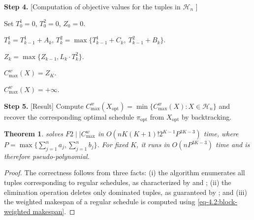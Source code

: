 \documentclass[12pt]{article}
\newtheorem{theorem}{Theorem}[section]
\begin{document}
\begin{sloppypar}
\begin{algorithm}[H]
            \textbf{Step 4.} [Computation of objective values for the tuples in $\mathcal{H}_n$ ] 
            
            {
                {
                    Set $T_0^1= 0$, $T_0^2=0$, $Z_0=0$. \;
                    
                    {
                        $T_k^1= T_{k-1}^1+A_k$, $T_k^2 = \max\{T_{k-1}^1+C_k,\ T_{k-1}^2+B_k\}$. \;
                        
                        $Z_k = \max \{Z_{k-1}, L_k \cdot T_k^2\}$. \;
                    }
                    
                    $C_{\max}^w(X)=Z_K$. \;                   
                }{
                    $C_{\max}^w(X)=+\infty$. \;
                }
            }
            \textbf{Step 5.} [Result] Compute $C_{\max}^w(X_{\mathrm{opt}})=\min \{C_{\max}^w(X): X \in \mathcal{H}_n\}$ and recover the corresponding optimal schedule $\pi_{\mathrm{opt}}$ from $X_{\mathrm{opt}}$ by backtracking. \;
            
        \end{algorithm}
        
        
        \begin{theorem}\label{thm:complexity}
             solves $F2 \mid \mid C_{\max}^w$ in $O(n K (K+1)! 2^{K-1} P^{3K-3})$ time, where
            $P = \max \{\sum_{j=1}^{n}a_j, \sum_{j=1}^{n}b_j\}$. For fixed $K$, it runs in $O(nP^{3K-3})$ time and is therefore pseudo-polynomial.
        \end{theorem}
        
        \begin{proof}
            The correctness follows from three facts: (i) the algorithm enumerates all tuples corresponding to regular schedules, as  characterized by  and ; (ii) the elimination operation deletes only dominated tuples, as guaranteed by ; and (iii) the weighted makespan of a regular schedule is computed using \cref{eq-4.2:block-weighted makespan}.
            

\end{proof}
\end{sloppypar}
\end{document}
